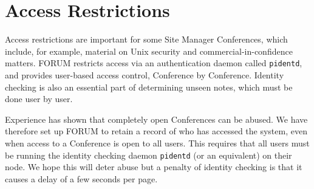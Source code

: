 \documentclass[twoside,11pt]{article}
\begin{document}
\section{\label{sec:access}Access Restrictions}

Access restrictions are important for some Site Manager Conferences,
which include, for example, material on Unix security and
commercial-in-confidence matters.  FORUM restricts access via an
authentication daemon called {\tt pidentd}, and provides user-based
access control, Conference by Conference.  Identity checking is also an
essential part of determining unseen notes, which must be done user by
user.

Experience has shown that completely open Conferences can be abused.
We have therefore set up FORUM to retain a record of who has accessed
the system, even when access to a Conference is open to all users.
This requires that all users must be running the identity checking
daemon {\tt pidentd} (or an equivalent) on their node.  We hope this
will deter abuse but  a penalty of identity checking is that it causes
a delay of a few seconds per page.
\end{document}
